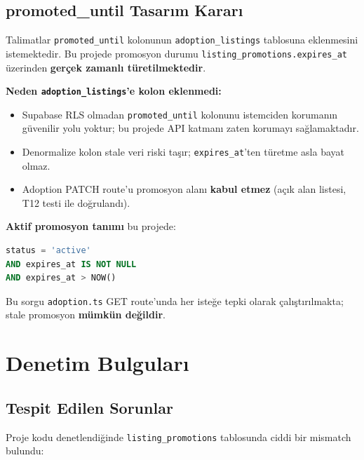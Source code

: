 \documentclass[12pt,a4paper]{article}
\begin{document}
\subsection{promoted\_until Tasarım Kararı}

Talimatlar \texttt{promoted\_until} kolonunun \texttt{adoption\_listings} tablosuna
eklenmesini istemektedir. Bu projede promosyon durumu
\texttt{listing\_promotions.expires\_at} üzerinden \textbf{gerçek zamanlı türetilmektedir}.

\medskip
\noindent\textbf{Neden \texttt{adoption\_listings}'e kolon eklenmedi:}

\begin{itemize}[leftmargin=1.5em]
  \item Supabase RLS olmadan \texttt{promoted\_until} kolonunu istemciden
        korumanın güvenilir yolu yoktur; bu projede API katmanı zaten korumayı sağlamaktadır.
  \item Denormalize kolon stale veri riski taşır; \texttt{expires\_at}'ten türetme
        asla bayat olmaz.
  \item Adoption PATCH route'u promosyon alanı \textbf{kabul etmez}
        (açık alan listesi, T12 testi ile doğrulandı).
\end{itemize}

\medskip
\textbf{Aktif promosyon tanımı} bu projede:
\begin{lstlisting}[language=SQL]
status = 'active'
AND expires_at IS NOT NULL
AND expires_at > NOW()
\end{lstlisting}

Bu sorgu \texttt{adoption.ts} GET route'unda her isteğe tepki olarak
çalıştırılmakta; stale promosyon \textbf{mümkün değildir}.

\section{Denetim Bulguları}

\subsection{Tespit Edilen Sorunlar}

Proje kodu denetlendiğinde \texttt{listing\_promotions} tablosunda
ciddi bir mismatch bulundu:
\end{document}
